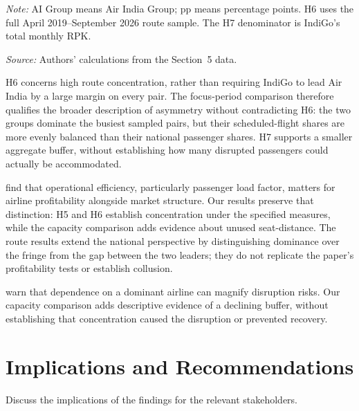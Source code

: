 \documentclass[12pt,a4paper]{article}
\begin{document}
\begin{minipage}{\linewidth}
\captionsetup{font=small,labelfont=bf,justification=raggedright,singlelinecheck=false,hypcap=false}
\label{tab:o4-hypotheses}
\centering
{\small{}\setlength{\tabcolsep}{5pt}\par}
\vspace{4pt}
{\footnotesize{}\raggedright\textit{Note:} AI Group means Air India Group; pp means percentage points. H6 uses the full April 2019--September 2026 route sample. The H7 denominator is IndiGo's total monthly RPK.\par
\textit{Source:} Authors' calculations from the Section~5 data.\par}
\end{minipage}

H6 concerns high route concentration, rather than requiring IndiGo to lead Air India by a large margin on every pair. The focus-period comparison therefore qualifies the broader description of asymmetry without contradicting H6: the two groups dominate the busiest sampled pairs, but their scheduled-flight shares are more evenly balanced than their national passenger shares. H7 supports a smaller aggregate buffer, without establishing how many disrupted passengers could actually be accommodated.

\textcite{kumari2026soaring} find that operational efficiency, particularly passenger load factor, matters for airline profitability alongside market structure. Our results preserve that distinction: H5 and H6 establish concentration under the specified measures, while the capacity comparison adds evidence about unused seat-distance. The route results extend the national perspective by distinguishing dominance over the fringe from the gap between the two leaders; they do not replicate the paper's profitability tests or establish collusion.

\textcite{gupta2025antitrust} warn that dependence on a dominant airline can magnify disruption risks. Our capacity comparison adds descriptive evidence of a declining buffer, without establishing that concentration caused the disruption or prevented recovery.


\section{Implications and Recommendations}
Discuss the implications of the findings for the relevant stakeholders.
\end{document}
